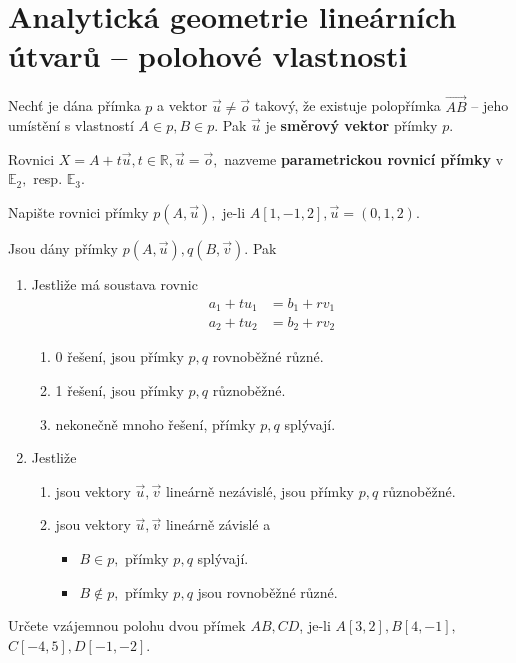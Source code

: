 \section{Analytická geometrie lineárních útvarů -- polohové vlastnosti}
\begin{definition}
    Nechť je dána přímka $p$ a vektor $\vec u\ne \vec o$
    takový, že existuje polopřímka $\overrightarrow{AB}$ --
    jeho umístění s vlastností $A\in p, B\in p.$ Pak $\vec u$
    je \textbf{směrový vektor} přímky $p.$
\end{definition}

\begin{definition}
    Rovnici $X = A+t\vec u, t\in \mathbb R, \vec u = \vec o,$ nazveme
    \textbf{parametrickou rovnicí přímky} v $\mathbb E_2,$ resp. $\mathbb E_3.$
\end{definition}

\begin{priklad}
Napište rovnici přímky $p(A,\vec u),$ je-li $A[1,-1,2], \vec u = (0,1,2).$
\end{priklad}

\begin{veta}
    Jsou dány přímky $p(A,\vec u), q(B,\vec v).$ Pak
    \begin{enumerate}[$i.$]
    \item Jestliže má soustava rovnic
    \begin{align*}
        a_1+tu_1 &= b_1 + rv_1 \\
        a_2+tu_2 &= b_2 + rv_2
    \end{align*}
    \begin{enumerate}[$a.$]
    \item 0 řešení, jsou přímky $p,q$ rovnoběžné různé.
   	\item 1 řešení, jsou přímky $p,q$ různoběžné.
   	\item nekonečně mnoho řešení, přímky $p,q$ splývají.
    \end{enumerate}
   	\item Jestliže
    \begin{enumerate}[$a.$]
    \item jsou vektory $\vec u, \vec v$ lineárně nezávislé, jsou přímky $p,q$ různoběžné.
   	\item jsou vektory $\vec u, \vec v$ lineárně závislé a
   	\begin{itemize}
    \item $B\in p,$ přímky $p,q$ splývají.
   	\item $B\notin p,$ přímky $p,q$ jsou rovnoběžné různé.
    \end{itemize}
    \end{enumerate}
    \end{enumerate}
\end{veta}
\begin{priklad}
Určete vzájemnou polohu dvou přímek $AB, CD$, je-li $A[3,2], B[4,-1],$\linebreak $C[-4,5],D[-1,-2]$.
\end{priklad}


